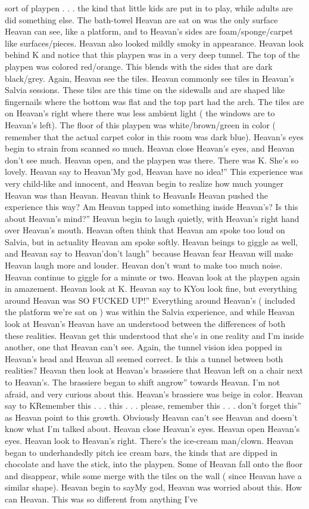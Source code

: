 \documentclass[12pt]{book}
\begin{document}
sort of playpen . . .  the kind that little kids are put in to play, while adults are did something else. The bath-towel Heavan are sat on was the only surface Heavan can see, like a platform, and to Heavan's sides are foam/sponge/carpet like surfaces/pieces. Heavan also looked mildly smoky in appearance. Heavan look behind K and notice that this playpen was in a very deep tunnel. The top of the playpen was colored red/orange. This blends with the sides that are dark black/grey. Again, Heavan see the tiles. Heavan commonly see tiles in Heavan's Salvia sessions. These tiles are this time on the sidewalls and are shaped like fingernails where the bottom was flat and the top part had the arch. The tiles are on Heavan's right where there was less ambient light ( the windows are to Heavan's left). The floor of this playpen was white/brown/green in color ( remember that the actual carpet color in this room was dark blue). Heavan's eyes begin to strain from scanned so much. Heavan close Heavan's eyes, and Heavan don't see much. Heavan open, and the playpen was there. There was K. She's so lovely. Heavan say to Heavan'My god, Heavan have no idea!'' This experience was very child-like and innocent, and Heavan begin to realize how much younger Heavan was than Heavan. Heavan think to HeavanIs Heavan pushed the experience this way? Am Heavan tapped into something inside Heavan's? Is this about Heavan's mind?'' Heavan begin to laugh quietly, with Heavan's right hand over Heavan's mouth. Heavan often think that Heavan am spoke too loud on Salvia, but in actuality Heavan am spoke softly. Heavan beings to giggle as well, and Heavan say to Heavan'don't laugh'' because Heavan fear Heavan will make Heavan laugh more and louder. Heavan don't want to make too much noise. Heavan continue to giggle for a minute or two. Heavan look at the playpen again in amazement. Heavan look at K. Heavan say to KYou look fine, but everything around Heavan was SO FUCKED UP!'' Everything around Heavan's ( included the platform we're sat on ) was within the Salvia experience, and while Heavan look at Heavan's Heavan have an understood between the differences of both these realities. Heavan get this understood that she's in one reality and I'm inside another, one that Heavan can't see. Again, the tunnel vision idea popped in Heavan's head and Heavan all seemed correct. Is this a tunnel between both realities? Heavan then look at Heavan's brassiere that Heavan left on a chair next to Heavan's. The brassiere began to shift angrow'' towards Heavan. I'm not afraid, and very curious about this. Heavan's brassiere was beige in color. Heavan say to KRemember this . . .  this . . .  please, remember this . . .  don't forget this'' as Heavan point to this growth. Obviously Heavan can't see Heavan and doesn't know what I'm talked about. Heavan close Heavan's eyes. Heavan open Heavan's eyes. Heavan look to Heavan's right. There's the ice-cream man/clown. Heavan began to underhandedly pitch ice cream bars, the kinds that are dipped in chocolate and have the stick, into the playpen. Some of Heavan fall onto the floor and disappear, while some merge with the tiles on the wall ( since Heavan have a similar shape). Heavan begin to sayMy god, Heavan was worried about this. How can Heavan. This was so different from anything I've 
\end{document}
